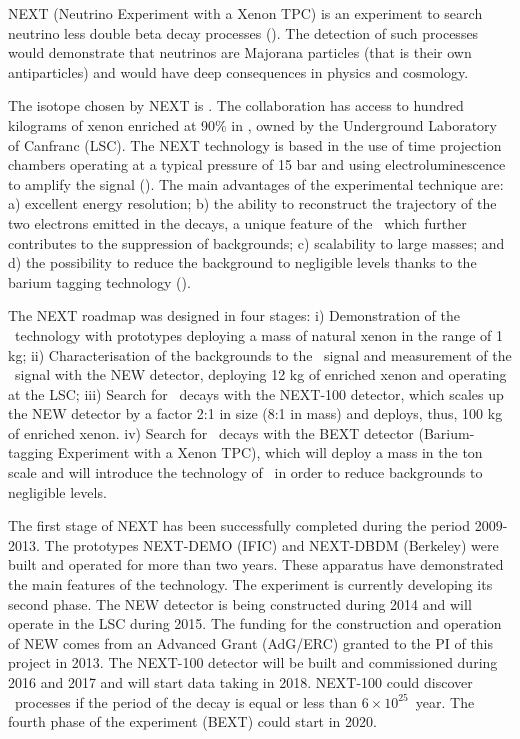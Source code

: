 
NEXT (Neutrino Experiment with a Xenon TPC) is an experiment to search neutrino less double beta decay processes (\bbonu). The detection of such processes would demonstrate that neutrinos are Majorana particles (that is their own antiparticles) and would have deep consequences in physics and cosmology.  

The isotope chosen by NEXT is  \XE. The collaboration has access to hundred kilograms of xenon enriched at 90\% in \XE, owned by the Underground Laboratory of Canfranc (LSC). The NEXT technology is based in the use of time projection chambers operating at a typical pressure of 15 bar and using electroluminescence to amplify the signal (\HPXE). The main advantages of the experimental technique are: a) excellent energy resolution; b) the ability to reconstruct the trajectory of the two electrons emitted in the decays, a unique feature of the \HPXE\ which further contributes to the suppression of backgrounds; c) scalability to large masses; and d) the possibility to reduce the background to negligible levels thanks to the barium tagging technology (\BATA).

The NEXT roadmap was designed in four stages: i) Demonstration of the \HPXE\ technology with prototypes deploying a mass of natural xenon in the range of 1 kg; ii) Characterisation of the backgrounds to the \bbonu\ signal and measurement of the \bbtnu\ signal with the NEW detector, deploying 12 kg of enriched xenon and operating at the LSC; iii) Search for \bbonu\ decays with the NEXT-100 detector, which scales up the NEW detector by a factor 2:1 in size (8:1 in mass) and deploys, thus, 100 kg of enriched xenon. iv) Search for \bbonu\ decays with the BEXT detector (Barium-tagging Experiment with a Xenon TPC), which will deploy a mass in the ton scale and will introduce the technology of \BATA\ in order to reduce backgrounds to negligible levels.  

The first stage of NEXT has been successfully completed during the period 2009-2013. The prototypes NEXT-DEMO (IFIC) and NEXT-DBDM (Berkeley) were built and operated for more than two years. These apparatus have demonstrated the main features of the technology. The experiment is currently developing its second phase. The NEW detector is being constructed during 2014 and will operate in the LSC during 2015. The funding for the construction and operation of NEW comes from an Advanced Grant (AdG/ERC) granted to the PI of this project in 2013. The NEXT-100 detector will be built and commissioned during 2016 and 2017 and will start data taking in 2018. NEXT-100 could discover \bbonu\ processes if the period of the decay is equal or less than $6 \times 10^{25}$~year. The fourth phase of the experiment (BEXT) could start in 2020. 


